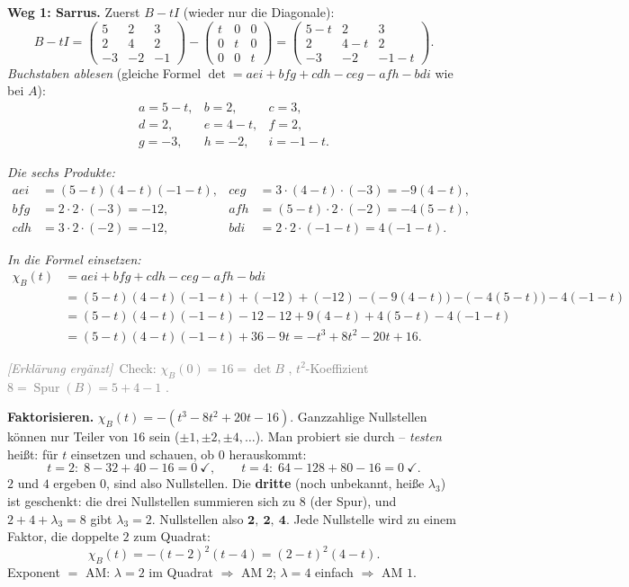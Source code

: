 \documentclass[a4paper,12pt]{article}
\newcommand{\erglerk}{\textcolor{gray}{\small\textit{[Erkl\"arung erg\"anzt]}}}
\begin{document}
\textbf{Weg 1: Sarrus.} Zuerst $B - tI$ (wieder nur die Diagonale):
\[
B - tI = \begin{pmatrix} 5 & 2 & 3 \\ 2 & 4 & 2 \\ -3 & -2 & -1 \end{pmatrix} - \begin{pmatrix} t & 0 & 0 \\ 0 & t & 0 \\ 0 & 0 & t \end{pmatrix} = \begin{pmatrix} 5-t & 2 & 3 \\ 2 & 4-t & 2 \\ -3 & -2 & -1-t \end{pmatrix}.
\]
\emph{Buchstaben ablesen} (gleiche Formel $\det = aei + bfg + cdh - ceg - afh - bdi$ wie bei $A$):
\[
\begin{array}{lll}
a = 5-t, & b = 2, & c = 3, \\
d = 2, & e = 4-t, & f = 2, \\
g = -3, & h = -2, & i = -1-t.
\end{array}
\]

\emph{Die sechs Produkte:}
\begin{align*}
aei &= (5-t)(4-t)(-1-t), & ceg &= 3\cdot(4-t)\cdot(-3) = -9(4-t), \\
bfg &= 2\cdot 2\cdot(-3) = -12, & afh &= (5-t)\cdot 2\cdot(-2) = -4(5-t), \\
cdh &= 3\cdot 2\cdot(-2) = -12, & bdi &= 2\cdot 2\cdot(-1-t) = 4(-1-t).
\end{align*}

\emph{In die Formel einsetzen:}
\begin{align*}
\chi_B(t) &= aei + bfg + cdh - ceg - afh - bdi \\
&= (5-t)(4-t)(-1-t) + (-12) + (-12) - \big(-9(4-t)\big) - \big(-4(5-t)\big) - 4(-1-t) \\
&= (5-t)(4-t)(-1-t) - 12 - 12 + 9(4-t) + 4(5-t) - 4(-1-t) \\
&= (5-t)(4-t)(-1-t) + 36 - 9t = -t^3 + 8t^2 - 20t + 16.
\end{align*}

\erglerk\ \textcolor{gray}{\small Check: $\chi_B(0) = 16 = \det B$ \checkmark, $t^2$-Koeffizient $8 = \operatorname{Spur}(B) = 5+4-1$ \checkmark.}

\textbf{Faktorisieren.} $\chi_B(t) = -(t^3 - 8t^2 + 20t - 16)$. Ganzzahlige Nullstellen k\"onnen nur Teiler von $16$ sein ($\pm1, \pm2, \pm4, \dots$). Man probiert sie durch -- \emph{testen} hei\ss t: f\"ur $t$ einsetzen und schauen, ob $0$ herauskommt:
\[
t = 2:\; 8 - 32 + 40 - 16 = 0\ \checkmark, \qquad t = 4:\; 64 - 128 + 80 - 16 = 0\ \checkmark.
\]
$2$ und $4$ ergeben $0$, sind also Nullstellen. Die \textbf{dritte} (noch unbekannt, hei\ss e $\lambda_3$) ist geschenkt: die drei Nullstellen summieren sich zu $8$ (der Spur), und $2 + 4 + \lambda_3 = 8$ gibt $\lambda_3 = 2$. Nullstellen also $\mathbf{2,\ 2,\ 4}$. Jede Nullstelle wird zu einem Faktor, die doppelte $2$ zum Quadrat:
\[
\boxed{\chi_B(t) = -(t-2)^2(t-4) = (2-t)^2(4-t).}
\]
Exponent $=$ AM: $\lambda = 2$ im Quadrat $\Rightarrow$ AM $2$; $\lambda = 4$ einfach $\Rightarrow$ AM $1$.
\end{document}

